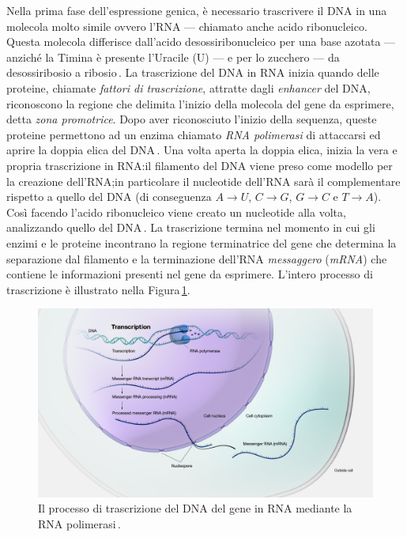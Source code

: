 Nella prima fase dell'espressione genica, è necessario trascrivere il DNA in una molecola molto simile ovvero l'RNA — chiamato anche acido ribonucleico. Questa molecola differisce dall'acido desossiribonucleico per una base azotata — anziché la Timina è presente l'Uracile (U) — e per lo zucchero — da desossiribosio a ribosio\,\cite{alberts2002dna}. La trascrizione del DNA in RNA inizia quando delle proteine, chiamate \textsl{fattori di trascrizione}, attratte dagli \textit{enhancer} del DNA, riconoscono la regione che delimita l'inizio della molecola del gene da esprimere, detta \textsl{zona promotrice}. Dopo aver riconosciuto l'inizio della sequenza, queste proteine permettono ad un enzima chiamato \textsl{RNA polimerasi} di attaccarsi ed aprire la doppia elica del DNA\,\cite{cramer2019organization}. Una volta aperta la doppia elica, inizia la vera e propria trascrizione in RNA:\@ il filamento del DNA viene preso come modello per la creazione dell'RNA;\@ in particolare il nucleotide dell'RNA sarà il complementare rispetto a quello del DNA (di conseguenza $A\rightarrow U$, $C\rightarrow G$, $G\rightarrow C$ e $T\rightarrow A$). Così facendo l'acido ribonucleico viene creato un nucleotide alla volta, analizzando quello del DNA\,\cite{alberts2002dna}. La trascrizione termina nel momento in cui gli enzimi e le proteine incontrano la regione terminatrice del gene che determina la separazione dal filamento e la terminazione dell'RNA \textsl{messaggero} (\textsl{mRNA}) che contiene le informazioni presenti nel gene da esprimere. L'intero processo di trascrizione è illustrato nella Figura\,\ref{fig:dna-transcription}.

\begin{figure}[b!]
    \centering
    \includegraphics[width=\textwidth]{assets/dna-transcription.jpg}
    \caption[Il processo di trascrizione del DNA in RNA.]{Il processo di trascrizione del DNA del gene in RNA mediante la RNA polimerasi\,\cite{nhgri_transcription_image}.}\label{fig:dna-transcription}
\end{figure}

